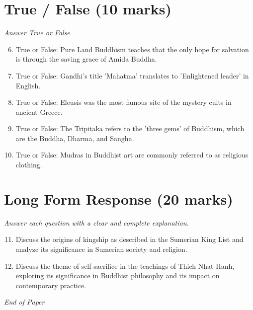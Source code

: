 \documentclass[12pt]{article}
\begin{document}
\section*{True / False (10 marks)}
\textit{Answer True or False}
\begin{enumerate}[label=\arabic*.]
\setcounter{enumi}{5}
\item True or False: Pure Land Buddhism teaches that the only hope for salvation is through the saving grace of Amida Buddha.
\item True or False: Gandhi's title 'Mahatma' translates to 'Enlightened leader' in English.
\item True or False: Eleusis was the most famous site of the mystery cults in ancient Greece.
\item True or False: The Tripitaka refers to the 'three gems' of Buddhism, which are the Buddha, Dharma, and Sangha.
\item True or False: Mudras in Buddhist art are commonly referred to as religious clothing.
\end{enumerate}

\section*{Long Form Response (20 marks)}
\textit{Answer each question with a clear and complete explanation.}
\begin{enumerate}[label=\arabic*.]
\setcounter{enumi}{10}
\item Discuss the origins of kingship as described in the Sumerian King List and analyze its significance in Sumerian society and religion.
\item Discuss the theme of self-sacrifice in the teachings of Thich Nhat Hanh, exploring its significance in Buddhist philosophy and its impact on contemporary practice.
\end{enumerate}

\vfill
\noindent\textit{End of Paper}
\end{document}
